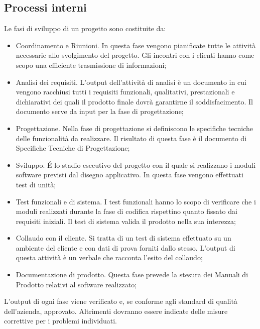 \subsection{Processi interni}
\label{1.4}
Le fasi di sviluppo di un progetto sono costituite da:
\begin{itemize}
\item Coordinamento e Riunioni.
In questa fase vengono pianificate tutte le attività necessarie allo svolgimento del progetto. Gli incontri con i clienti hanno come scopo una efficiente trasmissione di informazioni;
\item Analisi dei requisiti.
L'output dell'attività di analisi è un documento in cui vengono racchiusi tutti i requisiti funzionali, qualitativi, prestazionali e dichiarativi dei quali il prodotto finale dovrà garantirne il soddisfacimento. Il documento serve da input per la fase di progettazione;
\item Progettazione.
Nella fase di progettazione si definiscono le specifiche tecniche delle funzionalità da realizzare. Il risultato di questa fase è il documento di Specifiche Tecniche di Progettazione;
\item Sviluppo.
\'{E} lo stadio esecutivo del progetto con il quale si realizzano i moduli software previsti dal disegno applicativo. In questa fase vengono effettuati test di unità;
\item Test funzionali e di sistema.
I test funzionali hanno lo scopo di verificare che i moduli realizzati durante la fase di codifica rispettino quanto fissato dai requisiti iniziali. Il test di sistema valida il prodotto nella sua interezza;
\item Collaudo con il cliente.
Si tratta di un test di sistema effettuato su un ambiente del cliente e con dati di prova forniti dallo stesso. L'output di questa attività è un verbale che racconta l'esito del collaudo;
\item Documentazione di prodotto.
Questa fase prevede la stesura dei Manuali di Prodotto relativi al software realizzato;\\
\end{itemize}

L'output di ogni fase viene verificato e, se conforme agli standard di qualità dell'azienda, approvato. Altrimenti dovranno essere indicate delle misure correttive per i problemi individuati.\\

